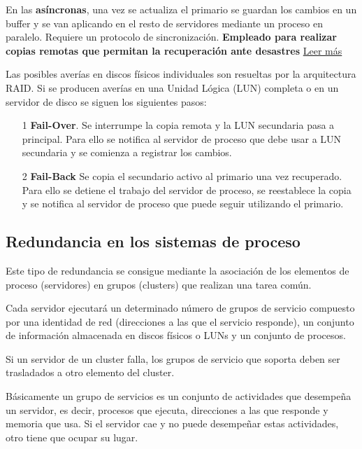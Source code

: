 \documentclass{apuntes}[nochap]
\begin{document}
En las \textbf{asíncronas}, una vez se actualiza el primario se guardan los cambios en un buffer y se van aplicando en el resto de servidores mediante un proceso en paralelo. Requiere un protocolo de sincronización. \textbf{Empleado para realizar copias remotas que permitan la recuperación ante desastres} \href{http://searchdatacenter.techtarget.com/es/consejo/Ventajas-e-inconvenientes-de-la-replicacion-remota-en-la-recuperacion-de-desastres}{Leer más}

Las posibles averías en discos físicos individuales son resueltas por la arquitectura RAID. Si se producen averías en una Unidad Lógica (LUN) completa o en un servidor de disco se siguen los siguientes pasos:
\begin{enumerate}
\item[1] \textbf{Fail-Over}. Se interrumpe la copia remota y la LUN secundaria pasa a principal. Para ello se notifica al servidor de proceso que debe usar a LUN secundaria y se comienza a registrar los cambios.

\item[2] \textbf{Fail-Back} Se copia el secundario activo al primario una vez recuperado. Para ello se detiene el trabajo del servidor de proceso, se reestablece la copia y se notifica al servidor de proceso que puede seguir utilizando el primario.
\end{enumerate}


\subsection{Redundancia en los sistemas de proceso}
Este tipo de redundancia se consigue mediante la asociación de los elementos de proceso (servidores) en grupos (clusters) que realizan una tarea común.

Cada servidor ejecutará un determinado número de grupos de servicio compuesto por una identidad de red (direcciones a las que el servicio responde), un conjunto de información almacenada en discos físicos o LUNs y un conjunto de procesos.

Si un servidor de un cluster falla, los grupos de servicio que soporta deben ser trasladados a otro elemento del cluster.

Básicamente un grupo de servicios es un conjunto de actividades que desempeña un servidor, es decir, procesos que ejecuta, direcciones a las que responde y memoria que usa. Si el servidor cae y no puede desempeñar estas actividades, otro tiene que ocupar su lugar.
\end{document}

